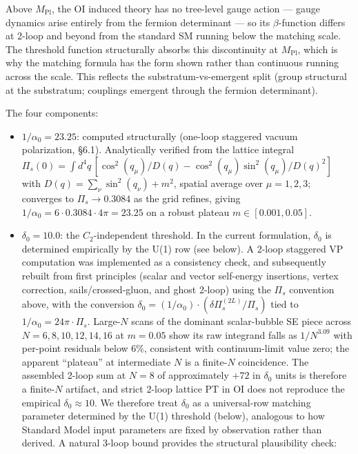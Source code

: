 \documentclass[
]{article}
\begin{document}
Above \(M_{\text{Pl}}\), the OI induced theory has no tree-level gauge
action --- gauge dynamics arise entirely from the fermion determinant
--- so its \(\beta\)-function differs at 2-loop and beyond from the
standard SM running below the matching scale. The threshold function
structurally absorbs this discontinuity at \(M_{\text{Pl}}\), which is
why the matching formula has the form shown rather than continuous
running across the scale. This reflects the substratum-vs-emergent split
(group structural at the substratum; couplings emergent through the
fermion determinant).

The four components:

\begin{itemize}
\item
  \(1/\alpha_0 = 23.25\): computed structurally (one-loop staggered
  vacuum polarization, §6.1). Analytically verified from the lattice
  integral
  \(\Pi_s(0) = \int d^4q\,[\cos^2(q_\mu)/D(q) - \cos^2(q_\mu)\sin^2(q_\mu)/D(q)^2]\)
  with \(D(q) = \sum_\nu \sin^2(q_\nu) + m^2\), spatial average over
  \(\mu = 1, 2, 3\); converges to \(\Pi_s \to 0.3084\) as the grid
  refines, giving \(1/\alpha_0 = 6 \cdot 0.3084 \cdot 4\pi = 23.25\) on
  a robust plateau \(m \in [0.001, 0.05]\).
\item
  \(\delta_0 = 10.0\): the \(C_2\)-independent threshold. In the current
  formulation, \(\delta_0\) is determined empirically by the U(1) row
  (see below). A 2-loop staggered VP computation was implemented as a
  consistency check, and subsequently rebuilt from first principles
  (scalar and vector self-energy insertions, vertex correction,
  sails/crossed-gluon, and ghost 2-loop) using the \(\Pi_s\) convention
  above, with the conversion
  \(\delta_0 = (1/\alpha_0) \cdot (\delta\Pi_s^{(2L)}/\Pi_s)\) tied to
  \(1/\alpha_0 = 24\pi \cdot \Pi_s\). Large-\(N\) scans of the dominant
  scalar-bubble SE piece across \(N = 6, 8, 10, 12, 14, 16\) at
  \(m = 0.05\) show its raw integrand falls as \(1/N^{3.09}\) with
  per-point residuals below \(6\%\), consistent with continuum-limit
  value zero; the apparent ``plateau'' at intermediate \(N\) is a
  finite-\(N\) coincidence. The assembled 2-loop sum at \(N = 8\) of
  approximately \(+72\) in \(\delta_0\) units is therefore a
  finite-\(N\) artifact, and strict 2-loop lattice PT in OI does not
  reproduce the empirical \(\delta_0 \approx 10\). We therefore treat
  \(\delta_0\) as a universal-row matching parameter determined by the
  U(1) threshold (below), analogous to how Standard Model input
  parameters are fixed by observation rather than derived. A natural
  3-loop bound provides the structural plausibility check:


\end{itemize}
\end{document}
